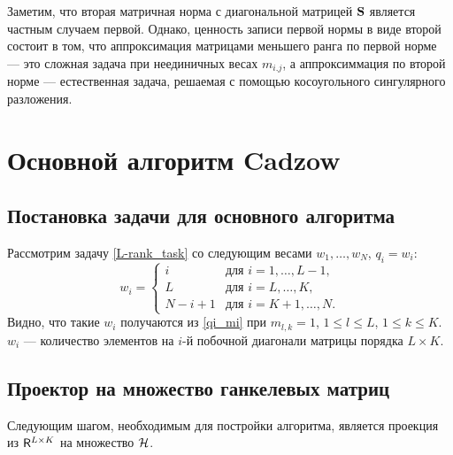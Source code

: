 \documentclass[12pt,a4paper,fleqn,leqno]{article}
\DeclareMathOperator{\tr}{tr}
\begin{document}
Заметим, что вторая матричная норма с диагональной матрицей $\mathbf{S}$ является частным случаем первой.
Однако, ценность записи первой нормы в виде
второй состоит в том, что аппроксимация матрицами меньшего ранга по первой норме --- это сложная задача при неединичных весах
$m_{i.j}$, а аппроксиммация по второй норме --- естественная задача, решаемая с помощью косоугольного сингулярного разложения.


\section{Основной алгоритм Cadzow}

\subsection{Постановка задачи для основного алгоритма} \label{basic_task}
Рассмотрим задачу \eqref{L-rank_task} со следующим весами $w_1, \ldots , w_N$, $q_i = w_i$:
\begin{equation} \label{hankel_weight}
w_i = \begin{cases}
i & \text{для $i = 1, \ldots, L-1,$}\\
L & \text{для $i = L, \ldots, K,$}\\
N - i + 1 & \text{для $i = K + 1, \ldots, N.$}
\end{cases}
\end{equation}
Видно, что такие $w_i$ получаются из \eqref{qi_mi} при $m_{l, k} = 1$, $1 \le l \le L$, $1 \le k \le K$. $w_i$ --- количество элементов на $i$-й побочной диагонали матрицы порядка $L \times K$.

\subsection{Проектор на множество ганкелевых матриц} \label{basic_hankel_proj}
Следующим шагом, необходимым для постройки алгоритма, является проекция из $\mathsf{R}^{L \times K}$ на множество $\mathcal{H}$.
\end{document}
